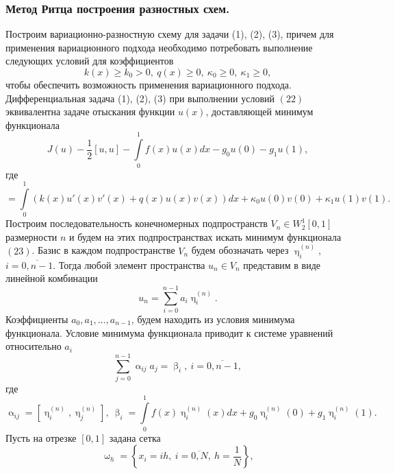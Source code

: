 \documentclass[a4paper, 12pt]{report}
\numberwithin{equation}{section}
\renewcommand{\geq}{\geqslant}
\renewcommand{\alpha}{\upalpha}
\renewcommand{\beta}{\upbeta}
\renewcommand{\eta}{\upeta}
\renewcommand{\omega}{\upomega}
\begin{document}
		\subsubsection{Метод Ритца построения разностных схем.}
		Построим вариационно-разностную схему для задачи (1), (2), (3), причем для применения вариационного подхода необходимо потребовать выполнение следующих условий для коэффициентов 
		\begin{equation}
			k(x)\geq k_0 > 0,\ q(x)\geq 0,\ \kappa_0 \geq 0,\ 
		\kappa_1 \geq 0,
		\end{equation}
		чтобы обеспечить возможность применения вариационного подхода.
		Дифференциальная задача (1), (2), (3) при выполнении условий $(22)$ эквивалентна задаче отыскания функции $u(x)$, доставляющей минимум функционала
		\begin{equation}
			J(u) - \dfrac{1}{2}[u,u] - \int\limits_0^1 f(x)u(x)dx - g_0 u(0) - g_1 u(1),
		\end{equation}
		где \begin{equation}
			[u,v] = \int\limits_0^1 (k(x) u'(x)v'(x) + q(x)u(x)v(x))dx + \kappa _0 u(0)v(0) + \kappa_1 u(1)v(1).
		\end{equation}
		Построим последовательность конечномерных подпространств $V_n \in W_2^1[0,1]$ размерности $n$ и будем на этих подпространствах искать минимум функционала $(23)$.
		Базис в каждом подпространстве $V_n$ будем обозначать через $\eta_i^{(n)}$, $i=\overline{0,n-1}$. Тогда любой элемент пространства $u_n \in V_n$ представим в виде линейной комбинации
		\begin{equation}
			u_n = \sum_{i=0}^{n-1} a_i \eta_i^{(n)}.
		\end{equation}
		Коэффициенты $a_0, a_1,\ldots, a_{n-1}$, будем находить из условия минимума функционала. Условие минимума функционала приводит к системе уравнений относительно $a_i$
		\begin{equation}
			\sum_{j=0}^{n-1}\alpha_{ij} a_j = \beta_i,\ i = \overline{0, n-1},
		\end{equation}
		где
		\begin{equation}
			\alpha_{ij} = [\eta_{i}^{(n)}, \eta_j^{(n)}],\ \beta_i = \int\limits_0^1 f(x)\eta_i^{(n)}(x)dx + g_0 \eta_i^{(n)}(0) + g_1 \eta_i^{(n)}(1).
		\end{equation}
		Пусть на отрезке $[0,1]$ задана сетка $$\omega_h = \left\{x_i = ih,\ i = \overline{0,N},\ h = \dfrac 1N\right\},$$
\end{document}
